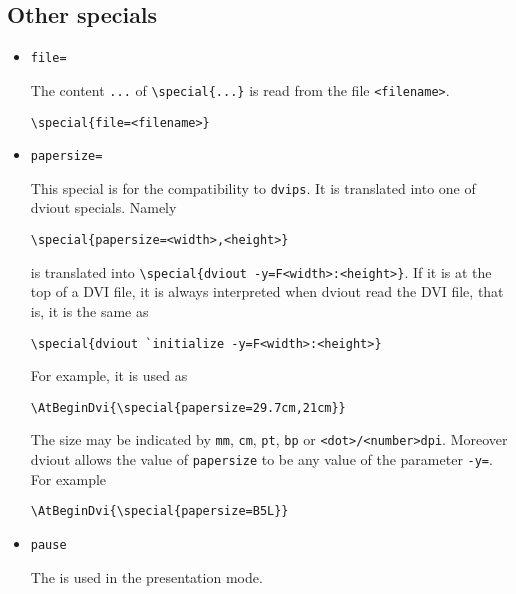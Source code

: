 \documentclass{article}
\begin{document}
\subsection{Other specials}
\begin{itemize}
\item{\tt file=}

The content \verb|...| of \verb|\special{...}| is
read from the file {\tt<filename>}.
\begin{verbatim}
\special{file=<filename>}
\end{verbatim}

\item{\tt papersize=}

This special is for the compatibility to {\tt dvips}.
It is translated into one of dviout specials.  Namely
\begin{verbatim}
\special{papersize=<width>,<height>}
\end{verbatim}
is translated into \verb|\special{dviout -y=F<width>:<height>}|.
If it is at the top of a DVI file, it is always interpreted
when dviout read the DVI file, that is, it is the same as
\begin{verbatim}
\special{dviout `initialize -y=F<width>:<height>}
\end{verbatim}
For example, it is used as
\begin{verbatim}
\AtBeginDvi{\special{papersize=29.7cm,21cm}}
\end{verbatim}
The size may be indicated by {\tt mm}, {\tt cm}, {\tt pt},
{\tt bp} or {\tt <dot>/<number>dpi}.
Moreover dviout allows the value of {\tt papersize} to be any 
value of the parameter {\tt -y=}.  For example
\begin{verbatim}
\AtBeginDvi{\special{papersize=B5L}}
\end{verbatim}

\item{\tt pause}

The  is used in the presentation mode.
\end{itemize}
\end{document}
